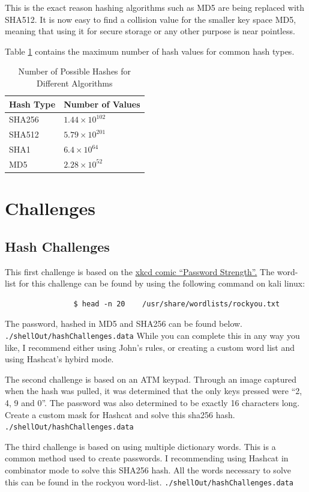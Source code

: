 			This is the exact reason hashing algorithms such as MD5 are being replaced with SHA512.
			It is now easy to find a collision value for the smaller key space MD5, meaning that using it for secure storage or any other purpose is near pointless.

			Table \ref{tab:HashCollisions} contains the maximum number of hash values for common hash types.
			\begin{table}[htb]
				\centering
				\begin{adjustbox}{max width=1\textwidth}
				\begin{tabular}{ll}
					\toprule
					\textbf{Hash Type} & \textbf{Number of Values} \\
					\toprule
					SHA256 & $1.44\times10^{102}$ \\
					SHA512 & $5.79\times10^{201}$ \\
					SHA1   & $6.4\times10^{64}$ \\
					MD5	   & $2.28\times10^{52}$ \\
					\bottomrule
				\end{tabular}
			\end{adjustbox}
				\label{tab:HashCollisions}
				\caption{Number of Possible Hashes for Different Algorithms}
			\end{table}
	\section{Challenges}
		\subsection{Hash Challenges}
			This first challenge is based on the \href{https://xkcd.com/936/}{xkcd comic ``Password Strength''.}
			The word-list for this challenge can be found by using the following command on kali linux:
			\begin{verbatim}
				$ head -n 20	/usr/share/wordlists/rockyou.txt
			\end{verbatim}
			The password, hashed in MD5 and SHA256 can be found below.
			\texttt{./shellOut/hashChallenges.data}
			While you can complete this in any way you like, I recommend either using John's rules, or creating a custom word list and using Hashcat's hybird mode.

			The second challenge is based on an ATM keypad.
			Through an image captured when the hash was pulled, it was determined that the only keys pressed were ``2, 4, 9 and 0''.
			The password was also determined to be exactly 16 characters long.
			Create a custom mask for Hashcat and solve this sha256 hash.
			\texttt{./shellOut/hashChallenges.data}

			The third challenge is based on using multiple dictionary words.
			This is a common method used to create passwords.
			I recommending using Hashcat in combinator mode to solve this SHA256 hash.
			All the words necessary to solve this can be found in the rockyou word-list.
			\texttt{./shellOut/hashChallenges.data}
